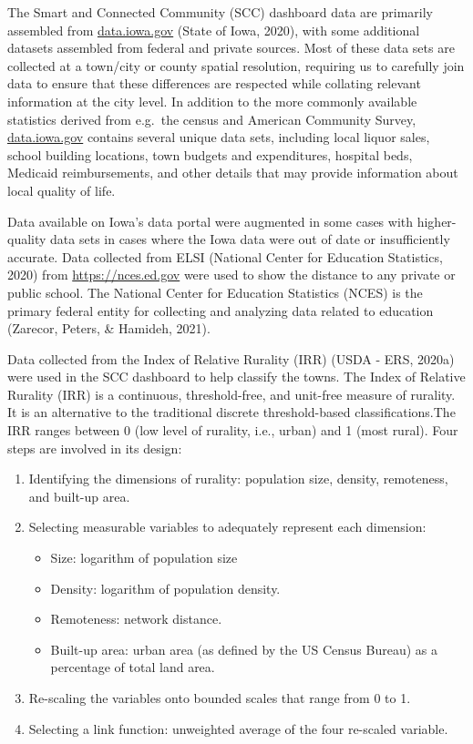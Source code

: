 \documentclass[print]{nuthesis}
\begin{document}
The Smart and Connected Community (SCC) dashboard data are primarily assembled from \url{data.iowa.gov} (State of Iowa, 2020), with some additional datasets assembled from federal and private sources. Most of these data sets are collected at a town/city or county spatial resolution, requiring us to carefully join data to ensure that these differences are respected while collating relevant information at the city level. In addition to the more commonly available statistics derived from e.g.~the census and American Community Survey, \url{data.iowa.gov} contains several unique data sets, including local liquor sales, school building locations, town budgets and expenditures, hospital beds, Medicaid reimbursements, and other details that may provide information about local quality of life.

Data available on Iowa's data portal were augmented in some cases with higher-quality data sets in cases where the Iowa data were out of date or insufficiently accurate.
Data collected from ELSI (National Center for Education Statistics, 2020) from \url{https://nces.ed.gov} were used to show the distance to any private or public school. The National Center for Education Statistics (NCES) is the primary federal entity for collecting and analyzing data related to education (Zarecor, Peters, \& Hamideh, 2021).

Data collected from the Index of Relative Rurality (IRR) (USDA - ERS, 2020a) were used in the SCC dashboard to help classify the towns. The Index of Relative Rurality (IRR) is a continuous, threshold-free, and unit-free measure of rurality. It is an alternative to the traditional discrete threshold-based classifications.The IRR ranges between 0 (low level of rurality, i.e., urban) and 1 (most rural). Four steps are involved in its design:

\begin{enumerate}
\item Identifying the dimensions of rurality: population size, density, remoteness, and built-up area.
\item Selecting measurable variables to adequately represent each dimension:
    \begin{itemize}
        \item Size: logarithm of population size
        \item Density: logarithm of population density.
        \item Remoteness: network distance.
        \item Built-up area: urban area (as defined by the US Census Bureau) as a percentage of total land area.
    \end{itemize}
\item Re-scaling the variables onto bounded scales that range from 0 to 1.
\item Selecting a link function: unweighted average of the four re-scaled variable.
\end{enumerate}
\end{document}
